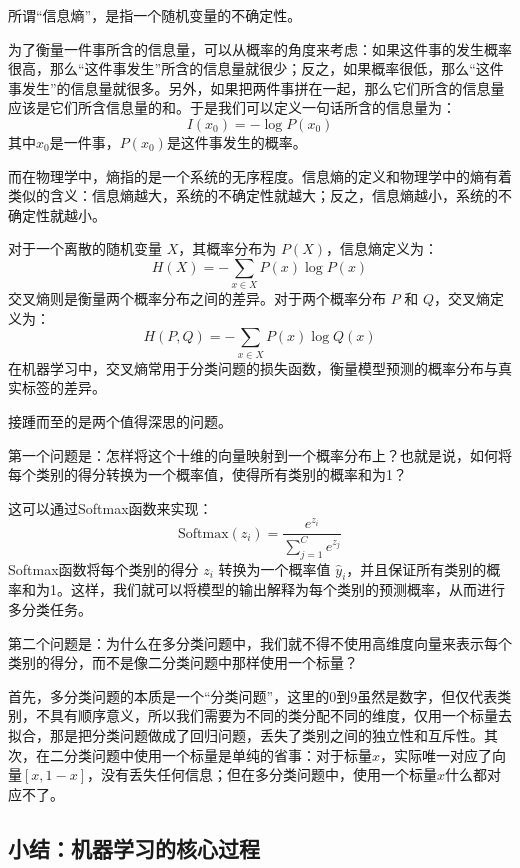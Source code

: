 \begin{framed}{}

    所谓“信息熵”，是指一个随机变量的不确定性。

    为了衡量一件事所含的信息量，可以从概率的角度来考虑：如果这件事的发生概率很高，那么“这件事发生”所含的信息量就很少；反之，如果概率很低，那么“这件事发生”的信息量就很多。另外，如果把两件事拼在一起，那么它们所含的信息量应该是它们所含信息量的和。于是我们可以定义一句话所含的信息量为：
    \[ I(x_0) = -\log P(x_0) \]
    其中$x_0$是一件事，$P(x_0)$是这件事发生的概率。

    而在物理学中，熵指的是一个系统的无序程度。信息熵的定义和物理学中的熵有着类似的含义：信息熵越大，系统的不确定性就越大；反之，信息熵越小，系统的不确定性就越小。

    对于一个离散的随机变量 $X$，其概率分布为 $P(X)$，信息熵定义为：
    \[ H(X) = -\sum_{x \in X} P(x) \log P(x) \]
    交叉熵则是衡量两个概率分布之间的差异。对于两个概率分布 $P$ 和 $Q$，交叉熵定义为：
    \[ H(P, Q) = -\sum_{x \in X} P(x) \log Q(x) \]
    在机器学习中，交叉熵常用于分类问题的损失函数，衡量模型预测的概率分布与真实标签的差异。

\end{framed}

接踵而至的是两个值得深思的问题。

第一个问题是：怎样将这个十维的向量映射到一个概率分布上？也就是说，如何将每个类别的得分转换为一个概率值，使得所有类别的概率和为1？

这可以通过Softmax函数来实现：
\[ \text{Softmax}(z_i) = \frac{e^{z_i}}{\sum_{j=1}^{C} e^{z_j}} \]
Softmax函数将每个类别的得分 $z_i$ 转换为一个概率值 $\hat{y}_i$，并且保证所有类别的概率和为1。这样，我们就可以将模型的输出解释为每个类别的预测概率，从而进行多分类任务。

第二个问题是：为什么在多分类问题中，我们就不得不使用高维度向量来表示每个类别的得分，而不是像二分类问题中那样使用一个标量？

首先，多分类问题的本质是一个“分类问题”，这里的0到9虽然是数字，但仅代表类别，不具有顺序意义，所以我们需要为不同的类分配不同的维度，仅用一个标量去拟合，那是把分类问题做成了回归问题，丢失了类别之间的独立性和互斥性。其次，在二分类问题中使用一个标量是单纯的省事：对于标量$x$，实际唯一对应了向量$[x, 1-x]$，没有丢失任何信息；但在多分类问题中，使用一个标量$x$什么都对应不了。

\subsection{小结：机器学习的核心过程}


